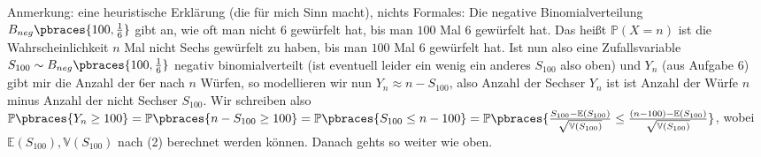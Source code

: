 \begin{solution}
Anmerkung: eine heuristische Erklärung (die für mich Sinn macht), nichts Formales: Die negative Binomialverteilung $B_{neg}\pbraces{100,\frac{1}{6}}$ gibt an, wie oft man nicht $6$ gewürfelt hat, bis man $100$ Mal $6$ gewürfelt hat. Das heißt $\mathbb{P}(X=n)$ ist die Wahrscheinlichkeit $n$ Mal nicht Sechs gewürfelt zu haben, bis man $100$ Mal 6 gewürfelt hat. Ist nun also eine Zufallsvariable $S_{100} \sim B_{neg}\pbraces{100,\frac{1}{6}}$ negativ binomialverteilt (ist eventuell leider ein wenig ein anderes $S_{100}$ also oben) und $Y_n$ (aus Aufgabe 6) gibt mir die Anzahl der $6$er nach $n$ Würfen, so modellieren wir nun $Y_n \approx n - S_{100}$, also Anzahl der Sechser $Y_n$ ist ist Anzahl der Würfe $n$ minus Anzahl der nicht Sechser $S_{100}$. Wir schreiben also $\mathbb{P}\pbraces{Y_n \geq 100} = \mathbb{P}\pbraces{n - S_{100} \geq 100} = \mathbb{P}\pbraces{S_{100} \leq n - 100} = \mathbb{P}\pbraces{\frac{S_{100} - \mathbb{E}(S_{100})}{\sqrt{\mathbb{V}(S_{100})}} \leq \frac{(n-100) - \mathbb{E}(S_{100})}{\sqrt{\mathbb{V}(S_{100})}}}$, wobei $\mathbb{E}(S_{100}),\mathbb{V}(S_{100})$ nach (2) berechnet werden können. Danach gehts so weiter wie oben.
\end{solution}
